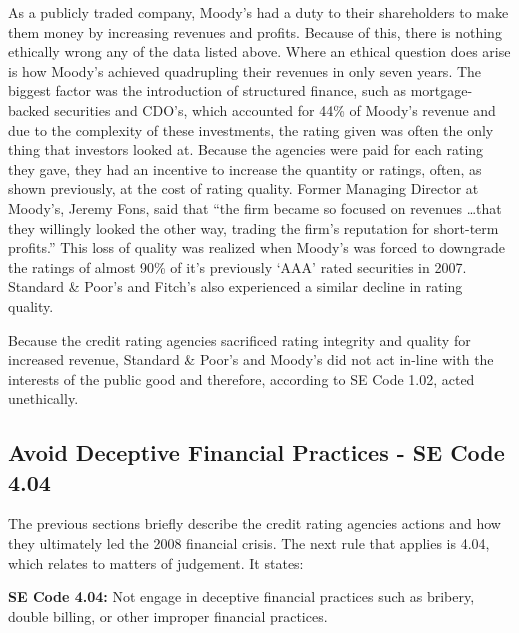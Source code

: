\documentclass[11pt]{article}
\begin{document}
\begin{multicols}{2}
As a publicly traded company, Moody's had a duty to their shareholders to make them money by increasing revenues and profits. Because of this, there is nothing ethically wrong any of the data listed above.  Where an ethical question does arise is how Moody's achieved quadrupling their revenues in only seven years.  The biggest factor was the introduction of structured finance, such as mortgage-backed securities and CDO's, which accounted for 44\% of Moody's revenue and due to the complexity of these investments, the rating given was often the only thing that investors looked at. \cite[p.149]{govtReport}  Because the agencies were paid for each rating they gave, they had an incentive to increase the quantity or ratings, often, as shown previously, at the cost of rating quality.  Former Managing Director at Moody's, Jeremy Fons, said that ``the firm became so focused on revenues \ldots that they willingly looked the other way, trading the firm's reputation for short-term profits.'' \cite[p.207]{govtReport} This loss of quality was realized when Moody's was forced to downgrade the ratings of almost 90\% of it's previously `AAA' rated securities in 2007.  Standard \& Poor's and Fitch's also experienced a similar decline in rating quality. \cite[p.212]{govtReport} 

Because the credit rating agencies sacrificed rating integrity and quality for increased revenue, Standard \& Poor's and Moody's did not act in-line with the interests of the public good and therefore, according to SE Code 1.02, acted unethically.


\subsection{Avoid Deceptive Financial Practices - SE Code 4.04}

The previous sections briefly describe the credit rating agencies actions and how they ultimately led the 2008 financial crisis.  The next rule that applies is 4.04, which relates to matters of judgement.  It states:


\begin{framed}
\noindent
   \textbf{SE Code 4.04: } 
   \newline
   [Do] Not engage in deceptive financial practices such as bribery, double billing, or other improper financial practices. \cite{SEcode}
\end{framed}



\end{multicols}
\end{document}
